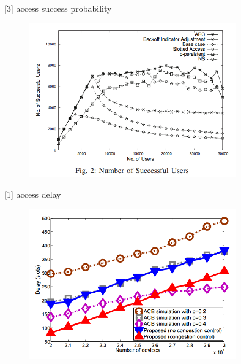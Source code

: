 \documentclass{beamer}
\begin{document}
\begin{frame}{[3] access success probability}
    \begin{figure}[t]
        \centering
        \includegraphics[width=0.8\textwidth]{figures/asp3.png}
    \end{figure}
\end{frame}
\begin{frame}{[1] access delay}
    \begin{figure}[t]
        \centering
        \includegraphics[width=0.8\textwidth]{figures/ad1.png}
    \end{figure}
\end{frame}
\end{document}
